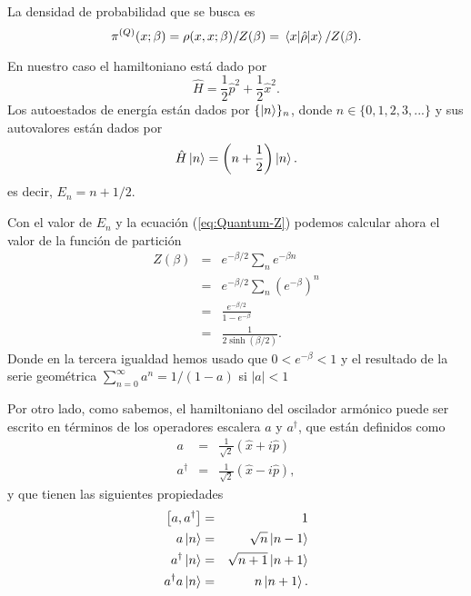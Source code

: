 \documentclass[%
 reprint,
 amsmath,amssymb,
 aps,
 pra,
]{revtex4-2}
\begin{document}
La densidad de probabilidad que se busca es
\begin{equation}
	\pi^{(Q)}(x;\beta) = \rho(x,x;\beta)/Z(\beta) = \ev{\hat{\rho}}{x}/Z(\beta). \label{eq:Quantum-pi}
\end{equation}

En nuestro caso el hamiltoniano está dado por
\begin{equation}
	\hat{H} = \frac{1}{2} \hat{p}^2 + \frac{1}{2} \hat{x}^2. \label{eq:Quantum-Hamiltonian}
\end{equation}
Los autoestados de energía están dados por $\{\ket{n}\}_n$, donde $n\in\{0,1,2,3,...\}$ y sus autovalores están dados por 
\begin{equation}
	\hat{H}\ket{n} = \left(n+\frac{1}{2}\right)\ket{n}.
\end{equation}
es decir, $E_n = n+1/2$.

Con el valor de $E_n$ y la ecuación (\ref{eq:Quantum-Z}) podemos calcular ahora el valor de la función de partición
\begin{eqnarray}
	Z(\beta) 	&=& e^{-\beta/2}\sum_n e^{-\beta n}    \nonumber\\
				&=&  e^{-\beta/2}\sum_n \left( e^{-\beta } \right)^n  \nonumber\\
				&=&  \frac{e^{-\beta/2}}{1 - e^{-\beta}} \nonumber \\
				&=& \frac{1}{2\sinh(\beta/2)}.
\end{eqnarray}
Donde en la tercera igualdad hemos usado que $0<e^{-\beta}<1$ y el resultado de la serie geométrica $\sum_{n=0}^\infty a^n = 1/(1-a)$ si $|a|<1$

Por otro lado, como sabemos, el hamiltoniano del oscilador armónico puede ser escrito en términos de los operadores escalera $a$ y $a^\dag$, que están definidos como
\begin{eqnarray}
	a &=& \frac{1}{\sqrt{2}}\left(\hat{x}+i\hat{p}\right) \label{eq:ladder-down}\\ 
	a^\dag &=& \frac{1}{\sqrt{2}}\left(\hat{x}-i\hat{p}\right) \label{eq:ladder-up},
\end{eqnarray}
y que tienen las siguientes propiedades
\begin{eqnarray}
	\left[ a, a^\dag \right] 	&=& 1 \\
								a\ket{n} &=& \sqrt{n}\ket{n-1} \label{eq:ladder-down-on-ket}\\
								a^\dag\ket{n} &=& \sqrt{n+1}\ket{n+1}\\
								a^\dag a\ket{n} &=& n\ket{n+1} \label{eq:number-on-ket}. 
\end{eqnarray}
\end{document}
